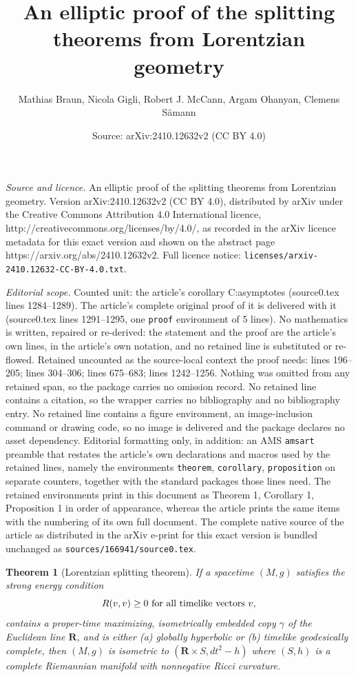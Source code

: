\documentclass[10pt,a4paper]{amsart}
\title{An elliptic proof of the splitting theorems from Lorentzian geometry}
\author{Mathias Braun, Nicola Gigli, Robert J. McCann, Argam Ohanyan, Clemens S\"amann}
\date{Source: arXiv:2410.12632v2 (CC BY 4.0)}
\newtheorem{theorem}{Theorem}
\newcommand{\R}{{\mathbf R}}
\begin{document}
\maketitle

\noindent\emph{Source and licence.} An elliptic proof of the splitting theorems from Lorentzian geometry. Version arXiv:2410.12632v2 (CC BY 4.0), distributed by arXiv under the Creative Commons Attribution 4.0 International licence, http://creativecommons.org/licenses/by/4.0/, as recorded in the arXiv licence metadata for this exact version and shown on the abstract page https://arxiv.org/abs/2410.12632v2. Full licence notice: \texttt{licenses/arxiv-2410.12632-CC-BY-4.0.txt}.\par\smallskip

\noindent\textit{Editorial scope.} Counted unit: the article's corollary C:asymptotes (source0.tex lines 1284--1289). The article's complete original proof of it is delivered with it (source0.tex lines 1291--1295, one \texttt{proof} environment of 5 lines). No mathematics is written, repaired or re-derived: the statement and the proof are the article's own lines, in the article's own notation, and no retained line is substituted or re-flowed.  Retained uncounted as the source-local context the proof needs: lines 196--205; lines 304--306; lines 675--683; lines 1242--1256.  Nothing was omitted from any retained span, so the package carries no omission record.  No retained line contains a citation, so the wrapper carries no bibliography and no bibliography entry.  No retained line contains a figure environment, an image-inclusion command or drawing code, so no image is delivered and the package declares no asset dependency.  Editorial formatting only, in addition: an AMS \texttt{amsart} preamble that restates the article's own declarations and macros used by the retained lines, namely the environments \texttt{theorem}, \texttt{corollary}, \texttt{proposition} on separate counters, together with the standard packages those lines need.  The retained environments print in this document as Theorem 1, Corollary 1, Proposition 1 in order of appearance, whereas the article prints the same items with the numbering of its own full document.  The complete native source of the article as distributed in the arXiv e-print for this exact version is bundled unchanged as \texttt{sources/166941/source0.tex}.
\begin{theorem}[Lorentzian splitting theorem]
\label{T:Lorentzian splitting}
If a spacetime $(M,g)$ satisfies the strong energy condition 
\begin{equation}\label{strong energy}
R(v,v) \ge 0\ \mbox{\rm for all timelike vectors}\ v,
\end{equation} 
contains a proper-time maximizing, isometrically embedded copy $\gamma$ of the Euclidean line $\R$,
and is either   (a) globally hyperbolic or (b) timelike geodesically complete,
then $(M,g)$ is isometric to $(\R \times S, dt^2 - h)$ where $(S,h)$ is a complete Riemannian manifold with nonnegative Ricci curvature.
\end{theorem}
\end{document}
